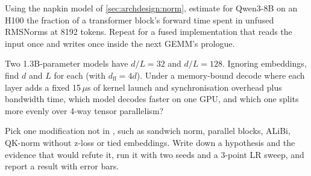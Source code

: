\begin{exercise}
Using the napkin model of \cref{sec:archdesign:norm}, estimate for Qwen3-8B on an H100 the fraction of a
transformer block's forward time spent in unfused RMSNorms at 8192 tokens. Repeat for a fused
implementation that reads the input once and writes once inside the next GEMM's prologue.
\end{exercise}

\begin{exercise}
Two 1.3B-parameter models have $d/L=32$ and $d/L=128$. Ignoring embeddings, find $d$ and $L$ for each
(with $d_\text{ff}=4d$). Under a memory-bound decode where each layer adds a fixed 15\,$\mu$s of kernel launch
and synchronisation overhead plus bandwidth time, which model decodes faster on one GPU, and which one
splits more evenly over 4-way tensor parallelism?
\end{exercise}

\begin{exercise}
Pick one modification not in , such as sandwich norm, parallel blocks, ALiBi,
QK-norm without z-loss or tied embeddings. Write down a hypothesis and the evidence that would refute it,
run it with two seeds and a 3-point LR sweep, and report a result with error bars.
\end{exercise}

